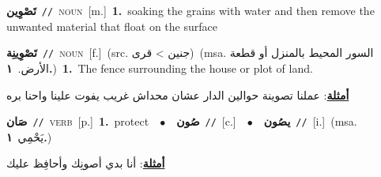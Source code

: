 \documentclass[10pt,a4paper,twoside]{article} %
\begin{document}
\begin{multicols}{2}
{\setlength\topsep{0pt}\textbf{\foreignlanguage{arabic}{تَصْوِين}}\ {\color{gray}\texttt{//}\color{black}}\ \textsc{noun}\ [m.]\ \textbf{1.}~soaking the grains with water and then remove the unwanted material that float on the surface\ } \vspace{2mm}

{\setlength\topsep{0pt}\textbf{\foreignlanguage{arabic}{تَصْوِينِة}}\ {\color{gray}\texttt{//}\color{black}}\ \textsc{noun}\ [f.]\ (src. \color{gray}\foreignlanguage{arabic}{جنين > قرى}\color{black})\ \color{gray}(msa. \foreignlanguage{arabic}{السور المحيط بالمنزل أو قطعة الأرض.}~\foreignlanguage{arabic}{\textbf{١.}})\color{black}\ \textbf{1.}~The fence surrounding the house or plot of land.\  \begin{flushright}\color{gray}\foreignlanguage{arabic}{\textbf{\underline{\foreignlanguage{arabic}{أمثلة}}}: عملنا تصوينة حوالين الدار عشان محداش غريب يفوت علينا واحنا بره}\end{flushright}\color{black}} \vspace{2mm}

{\setlength\topsep{0pt}\textbf{\foreignlanguage{arabic}{صَان}}\ {\color{gray}\texttt{//}\color{black}}\ \textsc{verb}\ [p.]\ \textbf{1.}~protect\ \ $\bullet$\ \ \setlength\topsep{0pt}\textbf{\foreignlanguage{arabic}{صُون}}\ {\color{gray}\texttt{//}\color{black}}\ [c.]\ \ $\bullet$\ \ \setlength\topsep{0pt}\textbf{\foreignlanguage{arabic}{يصُون}}\ {\color{gray}\texttt{//}\color{black}}\ [i.]\ \color{gray}(msa. \foreignlanguage{arabic}{يَحْمِي}~\foreignlanguage{arabic}{\textbf{١.}})\color{black}\  \begin{flushright}\color{gray}\foreignlanguage{arabic}{\textbf{\underline{\foreignlanguage{arabic}{أمثلة}}}: أنا بدي أصونِك وأحافِظ عليك}\end{flushright}\color{black}} \vspace{2mm}


\end{multicols}
\end{document}
